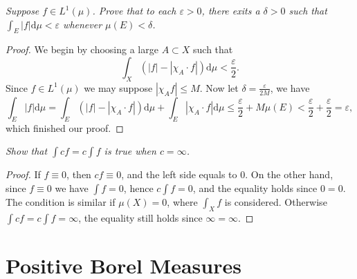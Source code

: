\begin{problem}\em
Suppose $f\in L^1(\mu)$. Prove that to each $\varepsilon>0$, there exits a $\delta>0$ such that $\int_E|f|\mathrm{d}\mu<\varepsilon$ whenever $\mu(E)<\delta$.
\end{problem}
\begin{proof}
We begin by choosing a large $A\subset X$ such that 
$$
\int_X{\left( \left| f \right|-\left| \chi _A\cdot f \right| \right) \mathrm{d}\mu}<\frac{\varepsilon}{2}.
$$
Since $f\in L^1(\mu)$ we may suppose $|\chi_Af|\le M$. Now let $\delta=\frac{\varepsilon}{2M}$, we have 
$$
\int_E{\left| f \right|\mathrm{d}\mu}=\int_E{\left( \left| f \right|-\left| \chi _A\cdot f \right| \right) \mathrm{d}\mu}+\int_E{\left| \chi _A\cdot f \right|\mathrm{d}\mu}\le \frac{\varepsilon}{2}+M\mu \left( E \right) <\frac{\varepsilon}{2}+\frac{\varepsilon}{2}=\varepsilon ,
$$
which finished our proof.
\end{proof}
\begin{problem}\em
Show that $\int cf=c\int f$ is true when $c=\infty$.
\end{problem}
\begin{proof}
If $f\equiv 0$, then $cf\equiv 0$, and the left side equals to $0$. On the other hand, since $f\equiv 0$ we have $\int f=0$, hence $c\int f=0$, and the equality holds since $0=0$. The condition is similar if $\mu(X)=0$, where $\int_Xf$ is considered. Otherwise $\int cf=c\int f=\infty$, the equality still holds since $\infty=\infty$.
\end{proof}
\newpage
\section{Positive Borel Measures}

